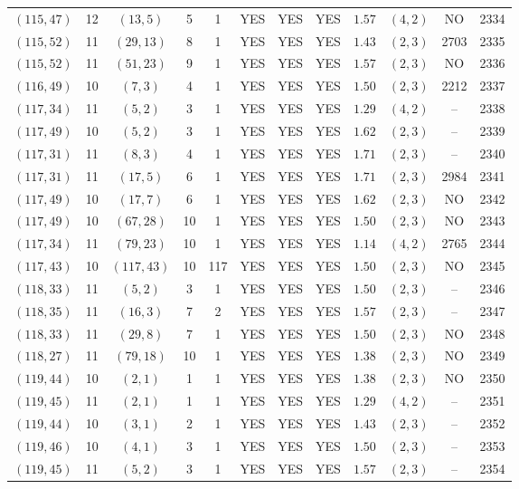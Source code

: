 \begin{longtable}{|c|c|c|c|c|c|c|c|c|c|c|c|}
$(115,47)$ & 12 & $(13,5)$ & 5 & 1 & YES & YES & YES & $1.57$ & $(4,2)$ & NO & 2334\\
$(115,52)$ & 11 & $(29,13)$ & 8 & 1 & YES & YES & YES & $1.43$ & $(2,3)$ & 2703 & 2335\\
$(115,52)$ & 11 & $(51,23)$ & 9 & 1 & YES & YES & YES & $1.57$ & $(2,3)$ & NO & 2336\\
$(116,49)$ & 10 & $(7,3)$ & 4 & 1 & YES & YES & YES & $1.50$ & $(2,3)$ & 2212 & 2337\\
$(117,34)$ & 11 & $(5,2)$ & 3 & 1 & YES & YES & YES & $1.29$ & $(4,2)$ & -- & 2338\\
$(117,49)$ & 10 & $(5,2)$ & 3 & 1 & YES & YES & YES & $1.62$ & $(2,3)$ & -- & 2339\\
$(117,31)$ & 11 & $(8,3)$ & 4 & 1 & YES & YES & YES & $1.71$ & $(2,3)$ & -- & 2340\\
$(117,31)$ & 11 & $(17,5)$ & 6 & 1 & YES & YES & YES & $1.71$ & $(2,3)$ & 2984 & 2341\\
$(117,49)$ & 10 & $(17,7)$ & 6 & 1 & YES & YES & YES & $1.62$ & $(2,3)$ & NO & 2342\\
$(117,49)$ & 10 & $(67,28)$ & 10 & 1 & YES & YES & YES & $1.50$ & $(2,3)$ & NO & 2343\\
$(117,34)$ & 11 & $(79,23)$ & 10 & 1 & YES & YES & YES & $1.14$ & $(4,2)$ & 2765 & 2344\\
$(117,43)$ & 10 & $(117,43)$ & 10 & 117 & YES & YES & YES & $1.50$ & $(2,3)$ & NO & 2345\\
$(118,33)$ & 11 & $(5,2)$ & 3 & 1 & YES & YES & YES & $1.50$ & $(2,3)$ & -- & 2346\\
$(118,35)$ & 11 & $(16,3)$ & 7 & 2 & YES & YES & YES & $1.57$ & $(2,3)$ & -- & 2347\\
$(118,33)$ & 11 & $(29,8)$ & 7 & 1 & YES & YES & YES & $1.50$ & $(2,3)$ & NO & 2348\\
$(118,27)$ & 11 & $(79,18)$ & 10 & 1 & YES & YES & YES & $1.38$ & $(2,3)$ & NO & 2349\\
$(119,44)$ & 10 & $(2,1)$ & 1 & 1 & YES & YES & YES & $1.38$ & $(2,3)$ & NO & 2350\\
$(119,45)$ & 11 & $(2,1)$ & 1 & 1 & YES & YES & YES & $1.29$ & $(4,2)$ & -- & 2351\\
$(119,44)$ & 10 & $(3,1)$ & 2 & 1 & YES & YES & YES & $1.43$ & $(2,3)$ & -- & 2352\\
$(119,46)$ & 10 & $(4,1)$ & 3 & 1 & YES & YES & YES & $1.50$ & $(2,3)$ & -- & 2353\\
$(119,45)$ & 11 & $(5,2)$ & 3 & 1 & YES & YES & YES & $1.57$ & $(2,3)$ & -- & 2354\\

\end{longtable}
